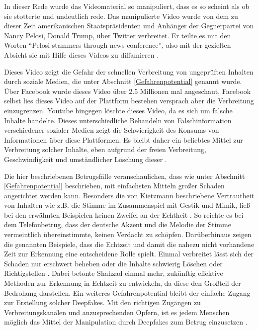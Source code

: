 In dieser Rede wurde das Videomaterial so manipuliert, dass es so scheint als ob sie stotterte und undeutlich rede.
Das manipulierte Video wurde von dem zu dieser Zeit amerikanischen Staatspräsidenten und Anhänger der Gegnerpartei von Nancy Pelosi, Donald Trump, über Twitter verbreitet.
Er teilte es mit den Worten ``Pelosi stammers through news conference'', also mit der gezielten Absicht sie mit Hilfe dieses Videos zu diffamieren \citep[][]{Mervosh2019}.
\par
Dieses Video zeigt die Gefahr der schnellen Verbreitung von ungeprüften Inhalten durch soziale Medien, die unter Abschnitt \ref{Gefahrenpotential} genannt wurde.
Über Facebook wurde dieses Video über 2.5 Millionen mal angeschaut, Facebook selbst lies dieses Video auf der Plattform bestehen versprach aber die Verbreitung einzugrenzen.
Youtube hingegen löschte dieses Video, da es sich um falsche Inhalte handelte.
Dieses unterschiedliche Behandeln von Falschinformation verschiedener sozialer Medien zeigt die Schwierigkeit des Konsums von Informationen über diese Plattformen.
Es bleibt daher ein beliebtes Mittel zur Verbreitung solcher Inhalte, eben aufgrund der freien Verbreitung, Geschwindigkeit und umständlicher Löschung dieser \citep[][]{Appel2022}.
\par
Die hier beschriebenen Betrugsfälle veranschaulichen, dass wie unter Abschnitt \ref{Gefahrenpotential} beschrieben, mit einfachsten Mitteln großer Schaden angerichtet werden kann.
Besonders die von Kietzmann beschriebene Vertrautheit von Inhalten wie z.B. die Stimme im Zusammenspiel mit Gestik und Mimik, ließ bei den erwähnten Beispielen keinen Zweifel an der Echtheit \citep[][]{Kietzmann2020}.
So reichte es bei dem Telefonbetrug, dass der deutsche Akzent und die Melodie der Stimme vermeintlich übereinstimmte, keinen Verdacht zu schöpfen.
Darüberhinaus zeigen die genannten Beispiele, dass die Echtzeit und damit die nahezu nicht vorhandene Zeit zur Erkennung eine entscheidene Rolle spielt.
Einmal verbreitet lässt sich der Schaden nur erschwert beheben oder die Inhalte schwierig Löschen oder Richtigstellen \citep[][]{Shahzad2022}.
Dabei betonte Shahzad einmal mehr, zukünftig effektive Methoden zur Erkennung in Echtzeit zu entwickeln, da diese den Großteil der Bedrohung darstellen.
Ein weiteres Gefahrenpotential bleibt der einfache Zugang zur Erstellung solcher Deepfakes.
Mit den richtigen Zugängen zu Verbreitungskanälen und anzusprechenden Opfern, ist es jedem Menschen möglich das Mittel der Manipulation durch Deepfakes zum Betrug einzusetzen \citep[][]{Appel2022}.


